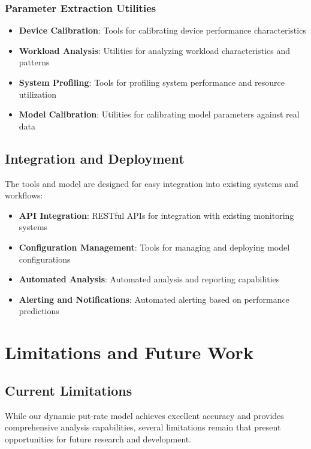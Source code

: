 \documentclass[11pt]{article}
\begin{document}
\subsubsection{Parameter Extraction Utilities}
\begin{itemize}
    \item \textbf{Device Calibration}: Tools for calibrating device performance characteristics
    \item \textbf{Workload Analysis}: Utilities for analyzing workload characteristics and patterns
    \item \textbf{System Profiling}: Tools for profiling system performance and resource utilization
    \item \textbf{Model Calibration}: Utilities for calibrating model parameters against real data
\end{itemize}

\subsection{Integration and Deployment}

The tools and model are designed for easy integration into existing systems and workflows:

\begin{itemize}
    \item \textbf{API Integration}: RESTful APIs for integration with existing monitoring systems
    \item \textbf{Configuration Management}: Tools for managing and deploying model configurations
    \item \textbf{Automated Analysis}: Automated analysis and reporting capabilities
    \item \textbf{Alerting and Notifications}: Automated alerting based on performance predictions
\end{itemize}

\section{Limitations and Future Work}

\subsection{Current Limitations}

While our dynamic put-rate model achieves excellent accuracy and provides comprehensive analysis capabilities, several limitations remain that present opportunities for future research and development.
\end{document}
